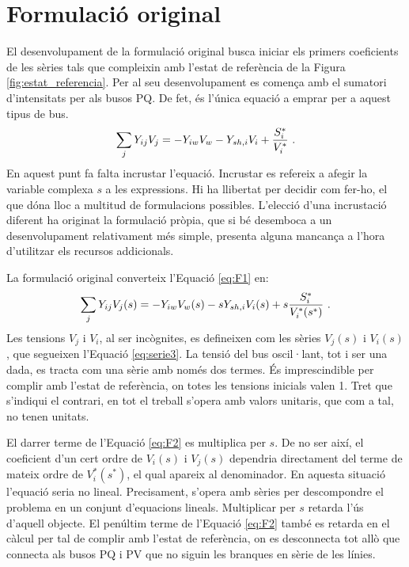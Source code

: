 \section{Formulació original}
El desenvolupament de la formulació original busca iniciar els primers coeficients de les sèries tals que compleixin amb l'estat de referència de la Figura \ref{fig:estat_referencia}. Per al seu desenvolupament es comença amb el sumatori d'intensitats per als busos PQ. De fet, és l'única equació a emprar per a aquest tipus de bus.
\begin{equation}
\sum_{j}Y_{ij}V_j = -Y_{iw}V_w-Y_{sh,i}V_i+\frac{S^*_i}{V^*_i}\ .
    \label{eq:F1}
\end{equation}
En aquest punt fa falta incrustar l'equació. Incrustar es refereix a afegir la variable complexa $s$ a les expressions. Hi ha llibertat per decidir com fer-ho, el que dóna lloc a multitud de formulacions possibles. L'elecció d'una incrustació diferent ha originat la formulació pròpia, que si bé desemboca a un desenvolupament relativament més simple, presenta alguna mancança a l'hora d'utilitzar els recursos addicionals.

La formulació original converteix l'Equació \ref{eq:F1} en:
\begin{equation}
    \sum_{j}Y_{ij}V_j(s) = -Y_{iw}V_w(s)-sY_{sh,i}V_i(s)+s\frac{S^*_i}{V^*_i(s^*)}\ .
        \label{eq:F2}
\end{equation}
Les tensions $V_j$ i $V_i$, al ser incògnites, es defineixen com les sèries $V_j(s)$ i $V_i(s)$, que segueixen l'Equació \ref{eq:serie3}. La tensió del bus oscil·lant, tot i ser una dada, es tracta com una sèrie amb només dos termes. És imprescindible per complir amb l'estat de referència, on totes les tensions inicials valen 1. Tret que s'indiqui el contrari, en tot el treball s'opera amb valors unitaris, que com a tal, no tenen unitats.

El darrer terme de l'Equació \ref{eq:F2} es multiplica per $s$. De no ser així, el coeficient d'un cert ordre de $V_i(s)$ i $V_j(s)$ dependria directament del terme de mateix ordre de $V^*_i(s^*)$, el qual apareix al denominador. En aquesta situació l'equació seria no lineal. Precisament, s'opera amb sèries per descompondre el problema en un conjunt d'equacions lineals. Multiplicar per $s$ retarda l'ús d'aquell objecte. El penúltim terme de l'Equació \ref{eq:F2} també es retarda en el càlcul per tal de complir amb l'estat de referència, on es desconnecta tot allò que connecta als busos PQ i PV que no siguin les branques en sèrie de les línies.

